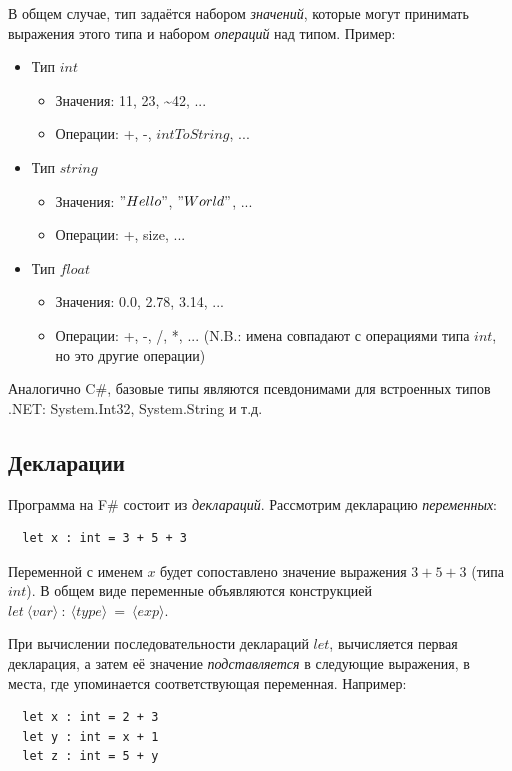 \documentclass[a4paper,11pt]{article}
\begin{document}
В общем случае, тип задаётся набором \emph{значений}, которые могут принимать
выражения этого типа и набором \emph{операций} над типом. Пример:
\begin{itemize}
\item Тип $int$
  \begin{itemize}
  \item Значения: 11, 23, \textasciitilde 42, ...
  \item Операции: +, -, $intToString$, ...
  \end{itemize}
\item Тип $string$
  \begin{itemize}
  \item Значения: $"Hello"$, $"World"$, ...
  \item Операции: +, size, ...
  \end{itemize}
\item Тип $float$
  \begin{itemize}
  \item Значения: 0.0, 2.78, 3.14, ...
  \item Операции: +, -, /, *, ... (N.B.: имена совпадают с операциями типа
    $int$, но это другие операции)
  \end{itemize}
\end{itemize}

Аналогично C\#, базовые типы являются псевдонимами для встроенных типов .NET:
System.Int32, System.String и т.д.

\subsection{Декларации}

Программа на F\# состоит из \emph{деклараций}. Рассмотрим декларацию
\emph{переменных}:
\begin{lstlisting}
  let x : int = 3 + 5 + 3
\end{lstlisting}

Переменной с именем $x$ будет сопоставлено значение выражения $3 + 5 + 3$ (типа
$int$). В общем виде переменные объявляются конструкцией 
$let~\langle var \rangle~:~\langle type \rangle~=~\langle exp \rangle$.

При вычислении последовательности деклараций $let$, вычисляется первая
декларация, а затем её значение \emph{подставляется} в следующие выражения,
в места, где упоминается соответствующая переменная. Например:
\begin{lstlisting}
  let x : int = 2 + 3
  let y : int = x + 1
  let z : int = 5 + y
\end{lstlisting}
\end{document}

